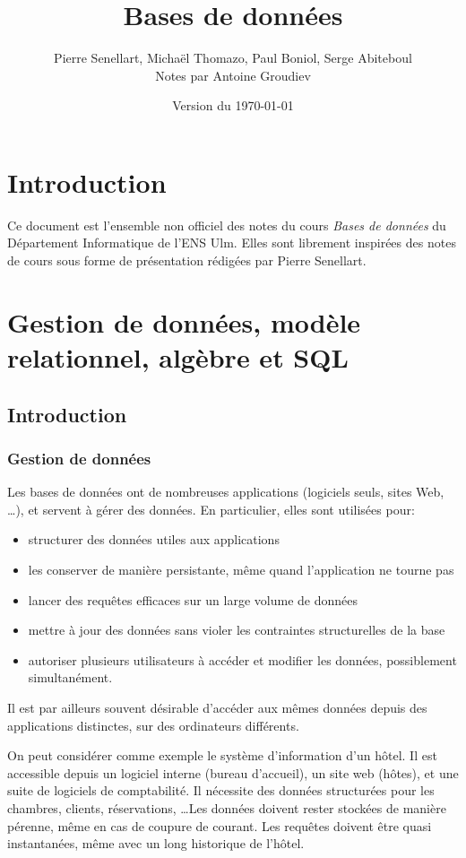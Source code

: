 \documentclass[french, toc]{../cs-classes/cs-classes}
\title{Bases de données}
\author{Pierre Senellart, Michaël Thomazo, Paul Boniol, Serge Abiteboul\\ Notes par Antoine Groudiev}
\date{Version du \today}
\begin{document}
\section*{Introduction}
Ce document est l'ensemble non officiel des notes du cours \emph{Bases de données} du Département Informatique de l'ENS Ulm. Elles sont librement inspirées des notes de cours sous forme de présentation rédigées par Pierre Senellart.

\section{Gestion de données, modèle relationnel, algèbre et SQL}
\subsection{Introduction} 
\subsubsection{Gestion de données}
Les bases de données ont de nombreuses applications (logiciels seuls, sites Web, \dots), et servent à gérer des données. En particulier, elles sont utilisées pour:
\begin{itemize}
    \item structurer des données utiles aux applications
    \item les conserver de manière persistante, même quand l'application ne tourne pas
    \item lancer des requêtes efficaces sur un large volume de données
    \item mettre à jour des données sans violer les contraintes structurelles de la base
    \item autoriser plusieurs utilisateurs à accéder et modifier les données, possiblement simultanément.
\end{itemize}
Il est par ailleurs souvent désirable d'accéder aux mêmes données depuis des applications distinctes, sur des ordinateurs différents.

On peut considérer comme exemple le système d'information d'un hôtel. Il est accessible depuis un logiciel interne (bureau d'accueil), un site web (hôtes), et une suite de logiciels de comptabilité. Il nécessite des données structurées pour les chambres, clients, réservations, \dots Les données doivent rester stockées de manière pérenne, même en cas de coupure de courant. Les requêtes doivent être quasi instantanées, même avec un long historique de l'hôtel.
\end{document}
